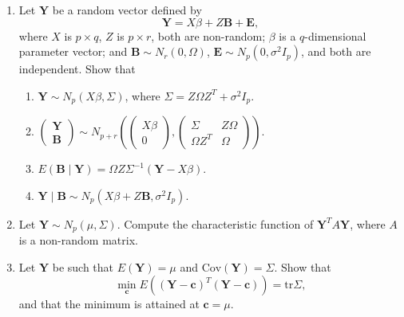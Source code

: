 \documentclass[12pt]{paper}
\numberwithin{equation}{section} %
\numberwithin{figure}{section} %
\numberwithin{table}{section} %
\begin{document}
\begin{enumerate}
\vspace{1.5cm}\item Let $\mathbf{Y}$ be a random vector defined by
$$\mathbf{Y} = X\beta + Z \mathbf{B} + \mathbf{E},$$
where $X$ is $p\times q$, $Z$ is $p\times r$, both are non-random; $\beta$ is a $q$-dimensional parameter vector; and $\mathbf{B}\sim N_r(0, \Omega)$, $\mathbf{E}\sim N_p(0, \sigma^2 I_p)$, and both are independent. Show that
\begin{enumerate}
  \item $\mathbf{Y}\sim N_p(X\beta, \Sigma)$, where $\Sigma = Z\Omega Z^T + \sigma^2 I_p$.
  \item $\begin{pmatrix} \mathbf{Y}\\ \mathbf{B}\end{pmatrix} \sim N_{p+r} \left(\begin{pmatrix} X\beta\\ 0\end{pmatrix}, \begin{pmatrix} \Sigma & Z\Omega\\ \Omega Z^T & \Omega\end{pmatrix}\right)$.
  \item $E(\mathbf{B} \mid \mathbf{Y}) = \Omega Z \Sigma^{-1}\left(\mathbf{Y} - X\beta\right)$.
  \item $\mathbf{Y} \mid \mathbf{B} \sim N_p(X\beta + Z\mathbf{B}, \sigma^2 I_p)$.
\end{enumerate}

\vspace{1.5cm}\item Let $\mathbf{Y}\sim N_p(\mu, \Sigma)$. Compute the characteristic function of $\mathbf{Y}^T A \mathbf{Y}$, where $A$ is a non-random matrix.

\vspace{1.5cm}\item Let $\mathbf{Y}$ be such that $E(\mathbf{Y}) = \mu$ and $\mathrm{Cov}(\mathbf{Y}) = \Sigma$. Show that
$$\min_\mathbf{c} E\left((\mathbf{Y} - \mathbf{c})^T(\mathbf{Y} - \mathbf{c})\right) = \mathrm{tr} \Sigma,$$
and that the minimum is attained at $\mathbf{c} = \mu$.


\end{enumerate}
\end{document}

